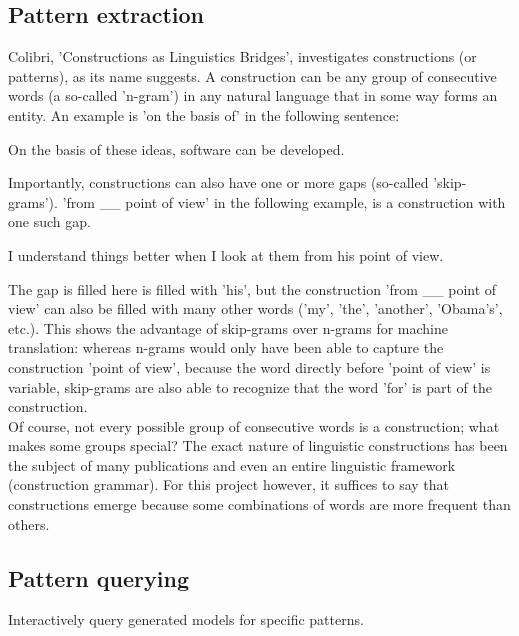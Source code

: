 \documentclass[12pt]{article}
\begin{document}
\subsection{Pattern extraction}

Colibri, 'Constructions as Linguistics Bridges', investigates constructions (or patterns), as its name suggests. A construction can be any group of consecutive words (a so-called 'n-gram') in any natural language that in some way forms an entity. An example is 'on the basis of' in the following sentence:

\begin{examples}
\item On the basis of these ideas, software can be developed.
\end{examples}

Importantly, constructions can also have one or more gaps (so-called 'skip-grams'). 'from \_\_ point of view' in the following example, is a construction with one such gap. 

\begin{examples}
\item I understand things better when I look at them from his point of view.
\end{examples}

The gap is filled here is filled with 'his', but the construction 'from \_\_ point of view' can also be filled with many other words ('my', 'the', 'another', 'Obama's', etc.). This shows the advantage of skip-grams over n-grams for machine translation: whereas n-grams would only have been able to capture the construction 'point of view', because the word directly before 'point of view' is variable, skip-grams are also able to recognize that the word 'for' is part of the construction.\\\indent
Of course, not every possible group of consecutive words is a construction; what makes some groups special? The exact nature of linguistic constructions has been the subject of many publications and even an entire linguistic framework (construction grammar). For this project however, it suffices to say that constructions emerge because some combinations of words are more frequent than others.


\subsection{Pattern querying} Interactively query generated models for specific patterns.
\end{document}
